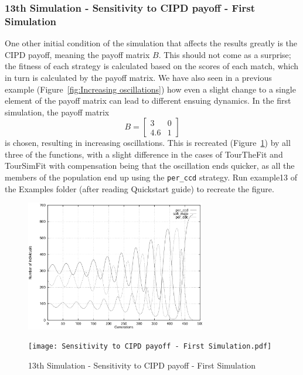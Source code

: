 \subsubsection{13th Simulation - Sensitivity to CIPD payoff - First Simulation}
One other initial condition of the simulation that affects the results greatly is the CIPD payoff, meaning the payoff matrix $B$. This should not come as a surprise; the fitness of each strategy is calculated based on the scores of each match, which in turn is calculated by the payoff matrix. We have also seen in a previous example (Figure~\ref{fig:Increasing oscillations}) how even a slight change to a single element of the payoff matrix can lead to different ensuing dynamics. In the first simulation, the payoff matrix 
\[
B = \begin{bmatrix} 3 & 0 \\ 4.6 & 1 \end{bmatrix}
\] 
is chosen, resulting in increasing oscillations. This is recreated (Figure~\ref{fig:Sensitivity to CIPD payoff - First Simulation}) by all three of the functions, with a slight difference in the cases of TourTheFit and TourSimFit with compensation being that the oscillation ends quicker, as all the members of the population end up using the \texttt{per\_ccd} strategy. Run example13 of the Examples folder (after reading Quickstart guide) to recreate the figure.
	\begin{figure}[h]
	    \centering
		\includegraphics[width=0.7\textwidth]{RefPaperFigures/fig10a.jpeg}\par\vspace{0.5em}
	    \texttt{[image: Sensitivity to CIPD payoff - First Simulation.pdf]}
	    \caption{13th Simulation - Sensitivity to CIPD payoff - First Simulation}
	    \label{fig:Sensitivity to CIPD payoff - First Simulation}
	\end{figure}
